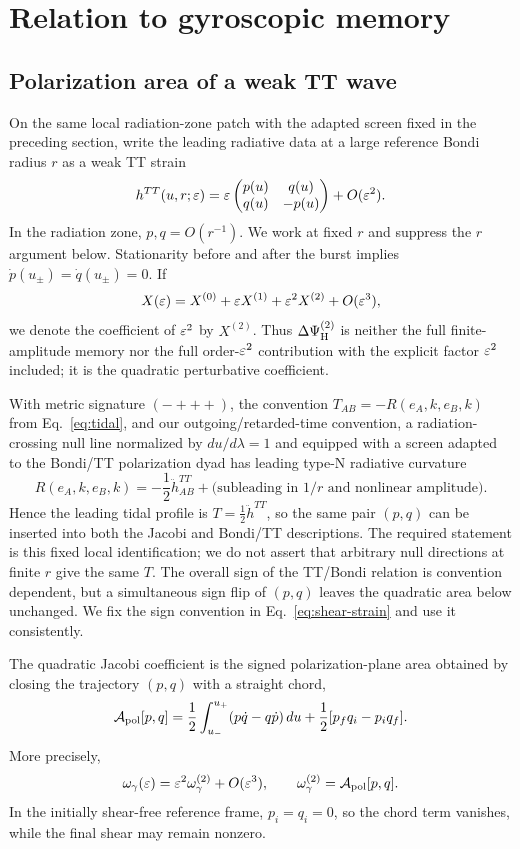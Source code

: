 \section{Relation to gyroscopic memory}
\subsection{Polarization area of a weak TT wave}
On the same local radiation-zone patch with the adapted screen fixed in the preceding section, write the leading radiative data at a large reference Bondi radius $r$ as a weak TT strain
\begin{equation}
h^{TT}(u,r;\varepsilon)=\varepsilon\begin{pmatrix}p(u)&q(u)\\q(u)&-p(u)\end{pmatrix}+O(\varepsilon^2).
\label{eq:tt}
\end{equation}
In the radiation zone, $p,q=O(r^{-1})$. We work at fixed $r$ and suppress the $r$ argument below. Stationarity before and after the burst implies $\dot p(u_\pm)=\dot q(u_\pm)=0$. If
\[
X(\varepsilon)=X^{(0)}+\varepsilon X^{(1)}+\varepsilon^2X^{(2)}+O(\varepsilon^3),
\]
we denote the coefficient of $\varepsilon^2$ by $X^{(2)}$. Thus $\Delta\Psi_{\rm H}^{(2)}$ is neither the full finite-amplitude memory nor the full order-$\varepsilon^2$ contribution with the explicit factor $\varepsilon^2$ included; it is the quadratic perturbative coefficient.

With metric signature $(-+++)$, the convention $T_{AB}=-R(e_A,k,e_B,k)$ from Eq.~\eqref{eq:tidal}, and our outgoing/retarded-time convention, a radiation-crossing null line normalized by $du/d\lambda=1$ and equipped with a screen adapted to the Bondi/TT polarization dyad has leading type-N radiative curvature
\[
R(e_A,k,e_B,k)=-\frac12\ddot h^{TT}_{AB}
+\text{(subleading in $1/r$ and nonlinear amplitude)}.
\]
Hence the leading tidal profile is $T=\frac12\ddot h^{TT}$, so the same pair $(p,q)$ can be inserted into both the Jacobi and Bondi/TT descriptions. The required statement is this fixed local identification; we do not assert that arbitrary null directions at finite $r$ give the same $T$. The overall sign of the TT/Bondi relation is convention dependent, but a simultaneous sign flip of $(p,q)$ leaves the quadratic area below unchanged. We fix the sign convention in Eq.~\eqref{eq:shear-strain} and use it consistently.

The quadratic Jacobi coefficient is the signed polarization-plane area obtained by closing the trajectory $(p,q)$ with a straight chord,
\begin{equation}
\mathcal A_{\rm pol}[p,q]
=\frac12\int_{u_-}^{u_+}(p\dot q-q\dot p)\,du
+\frac12[p_fq_i-p_iq_f].
\label{eq:area}
\end{equation}
More precisely,
\begin{equation}
\omega_\gamma(\varepsilon)=\varepsilon^2\omega_\gamma^{(2)}+O(\varepsilon^3),
\qquad
\omega_\gamma^{(2)}=\mathcal A_{\rm pol}[p,q].
\label{eq:omega-area}
\end{equation}
In the initially shear-free reference frame, $p_i=q_i=0$, so the chord term vanishes, while the final shear may remain nonzero.

